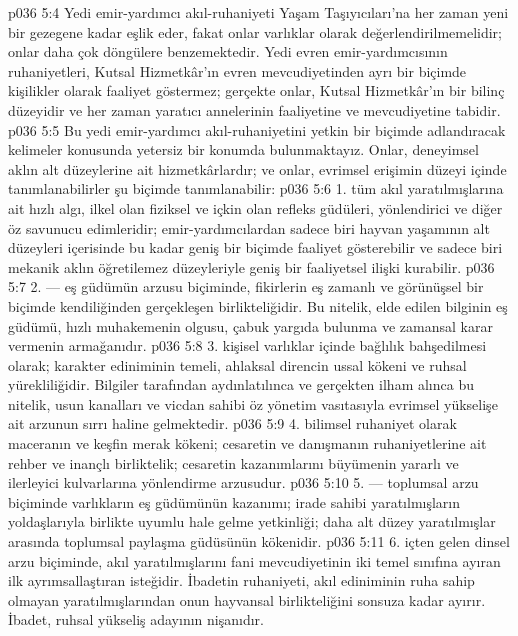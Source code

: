 \vs p036 5:4 Yedi emir\hyp{}yardımcı akıl\hyp{}ruhaniyeti Yaşam Taşıyıcıları’na her zaman yeni bir gezegene kadar eşlik eder, fakat onlar varlıklar olarak değerlendirilmemelidir; onlar daha çok döngülere benzemektedir. Yedi evren emir\hyp{}yardımcısının ruhaniyetleri, Kutsal Hizmetkâr’ın evren mevcudiyetinden ayrı bir biçimde kişilikler olarak faaliyet göstermez; gerçekte onlar, Kutsal Hizmetkâr’ın bir bilinç düzeyidir ve her zaman yaratıcı annelerinin faaliyetine ve mevcudiyetine tabidir.
\vs p036 5:5 Bu yedi emir\hyp{}yardımcı akıl\hyp{}ruhaniyetini yetkin bir biçimde adlandıracak kelimeler konusunda yetersiz bir konumda bulunmaktayız. Onlar, deneyimsel aklın alt düzeylerine ait hizmetkârlardır; ve onlar, evrimsel erişimin düzeyi içinde tanımlanabilirler şu biçimde tanımlanabilir:
\vs p036 5:6 1.\bibnobreakspace {} tüm akıl yaratılmışlarına ait hızlı algı, ilkel olan fiziksel ve içkin olan refleks güdüleri, yönlendirici ve diğer öz savunucu edimleridir; emir\hyp{}yardımcılardan sadece biri hayvan yaşamının alt düzeyleri içerisinde bu kadar geniş bir biçimde faaliyet gösterebilir ve sadece biri mekanik aklın öğretilemez düzeyleriyle geniş bir faaliyetsel ilişki kurabilir.
\vs p036 5:7 2.\bibnobreakspace {} --- eş güdümün arzusu biçiminde, fikirlerin eş zamanlı ve görünüşsel bir biçimde kendiliğinden gerçekleşen birlikteliğidir. Bu nitelik, elde edilen bilginin eş güdümü, hızlı muhakemenin olgusu, çabuk yargıda bulunma ve zamansal karar vermenin armağanıdır.
\vs p036 5:8 3.\bibnobreakspace {} kişisel varlıklar içinde bağlılık bahşedilmesi olarak; karakter ediniminin temeli, ahlaksal direncin ussal kökeni ve ruhsal yürekliliğidir. Bilgiler tarafından aydınlatılınca ve gerçekten ilham alınca bu nitelik, usun kanalları ve vicdan sahibi öz yönetim vasıtasıyla evrimsel yükselişe ait arzunun sırrı haline gelmektedir.
\vs p036 5:9 4.\bibnobreakspace {} bilimsel ruhaniyet olarak maceranın ve keşfin merak kökeni; cesaretin ve danışmanın ruhaniyetlerine ait rehber ve inançlı birliktelik; cesaretin kazanımlarını büyümenin yararlı ve ilerleyici kulvarlarına yönlendirme arzusudur.
\vs p036 5:10 5.\bibnobreakspace {} --- toplumsal arzu biçiminde varlıkların eş güdümünün kazanımı; irade sahibi yaratılmışların yoldaşlarıyla birlikte uyumlu hale gelme yetkinliği; daha alt düzey yaratılmışlar arasında toplumsal paylaşma güdüsünün kökenidir.
\vs p036 5:11 6.\bibnobreakspace {} içten gelen dinsel arzu biçiminde, akıl yaratılmışlarını fani mevcudiyetinin iki temel sınıfına ayıran ilk ayrımsallaştıran isteğidir. İbadetin ruhaniyeti, akıl ediniminin ruha sahip olmayan yaratılmışlarından onun hayvansal birlikteliğini sonsuza kadar ayırır. İbadet, ruhsal yükseliş adayının nişanıdır.
